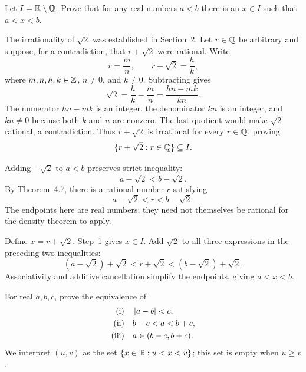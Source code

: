 

\goal Let $I=\mathbb{R}\setminus\mathbb{Q}$. Prove that for any real numbers $a<b$
there is an $x\in I$ such that $a<x<b$.

The irrationality of $\sqrt2$ was established in Section~2.
Let $r\in\mathbb{Q}$ be arbitrary and suppose, for a contradiction, that
$r+\sqrt2$ were rational. Write
\[
 r=\frac mn,\qquad r+\sqrt2=\frac hk,
\]
where $m,n,h,k\in\mathbb{Z}$, $n\ne0$, and $k\ne0$.
Subtracting gives
\[
 \sqrt2=\frac hk-\frac mn=\frac{hn-mk}{kn}.
\]
The numerator $hn-mk$ is an integer, the denominator $kn$ is an
integer, and $kn\ne0$ because both $k$ and $n$ are nonzero.
The last quotient would make $\sqrt2$ rational, a contradiction.
Thus $r+\sqrt2$ is irrational for every $r\in\mathbb{Q}$, proving
\[
 \{r+\sqrt2:r\in\mathbb{Q}\}\subseteq I.
\]

Adding $-\sqrt2$ to $a<b$ preserves strict inequality:
\[
 a-\sqrt2<b-\sqrt2.
\]
By Theorem~4.7, there is a rational number $r$ satisfying
\[
 a-\sqrt2<r<b-\sqrt2.
\]
The endpoints here are real numbers; they need not themselves be
rational for the density theorem to apply.

Define $x=r+\sqrt2$. Step~1 gives $x\in I$. Add $\sqrt2$ to all three
expressions in the preceding two inequalities:
\[
 (a-\sqrt2)+\sqrt2<r+\sqrt2<(b-\sqrt2)+\sqrt2.
\]
Associativity and additive cancellation simplify the endpoints, giving
$a<x<b$.



\goal For real $a,b,c$, prove the equivalence of
\begin{align*}
 \text{(i)}\quad&\left|a-b\right|<c,\\
 \text{(ii)}\quad&b-c<a<b+c,\\
 \text{(iii)}\quad&a\in(b-c,b+c).
\end{align*}
We interpret $(u,v)$ as the set $\{x\in\mathbb{R}:u<x<v\}$; this set is
empty when $u\ge v$.

